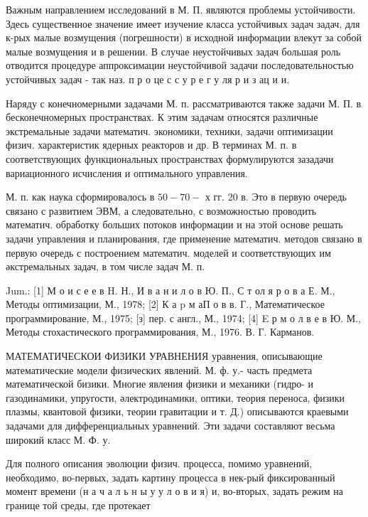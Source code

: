 \documentclass[10pt]{article}
\begin{document}
Важным направлением исследований в М. П. являются проблемы устойчивости. Здесь существенное значение имеет изучение класса устойчивых задач задач, для к-рых малые возмущения (погрешности) в исходной информации влекут за собой малые возмущения и в решении. В случае неустойчивых задач большая роль отводится процедуре аппроксимации неустойчивой задачи последовательностью устойчивых задач - так наз. п р о це с с у р е г у ля р и з ац и и.



Наряду с конечномерными задачами М. п. рассматриваются также задачи М. П. в бесконечномерных пространствах. К этим задачам относятся различные экстремальные задачи математич. экономики, техники, задачи оптимизации физич. характеристик ядерных реакторов и др. В терминах М. п. в соответствующих функциональных пространствах формулируются зазадачи вариационного исчисления и оптимального управления.



М. п. как наука сформировалось в $50-70-$ х гг. 20 в. Это в первую очередь связано с развитием ЭВМ, а следовательно, с возможностью проводить математич. обработку больших потоков информации и на этой основе решать задачи управления и планирования, где применение математич. методов связано в первую очередь с построением математич. моделей и соответствующих им әкстремальных задач, в том числе задач М. п.



Jum.: [1] М о и с е е в H. Н., И в а н и л о в Ю. П., С т ол я р о в а Е. М., Методы оптимизации, М., 1978; [2] К а p м аП о в в. Г., Математическое программирование, М., 1975; [з] пер. с англ., М., 1974; [4] E р м о л в е в Ю. М., Методы стохастического программирования, М., 1976. В. Г. Карманов.



МАТЕМАТИЧЕСКОИ ФИЗИКИ УРАВНЕНИЯ уравнения, описывающие математические модели физических явлений. М. ф. у.- часть предмета математической бизики. Многие явления физики и механики (гидро- и газодинамики, упругости, әлектродинамики, оптики, теория переноса, физики плазмы, квантовой физики, теории гравитации и т. Д.) описываются краевыми задачами для дифференциальных уравнений. Эти задачи составляют весьма широкий класс М. Ф. у.



Для полного описания эволюции физич. процесса, помимо уравнений, необходимо, во-первых, задать картину процесса в нек-рый фиксированный момент времени (н а ч а л ь н ы у у л о в и я) и, во-вторых, задать режим на границе той среды, где протекает
\end{document}

